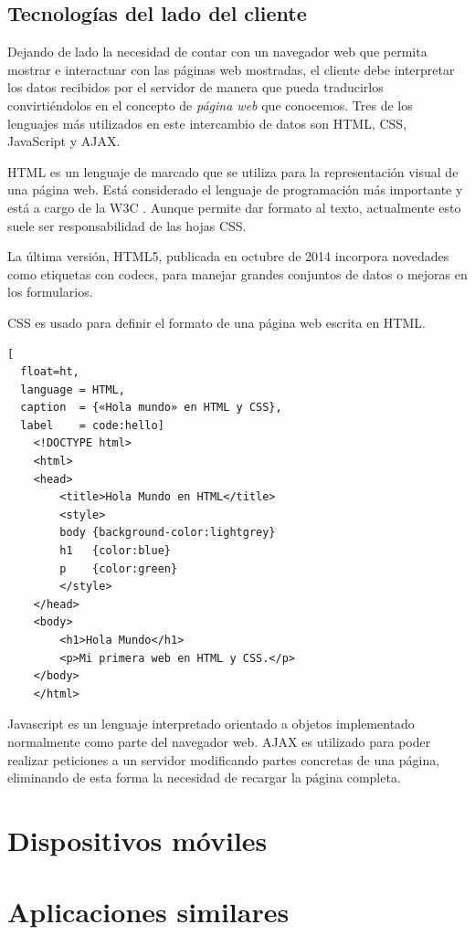 \subsection{Tecnologías del lado del cliente}
Dejando de lado la necesidad de contar con un navegador web que permita mostrar e interactuar con las páginas web mostradas, el cliente debe interpretar los datos recibidos por el servidor de manera que pueda traducirlos convirtiéndolos en el concepto de \textit{página web} que conocemos. Tres de los lenguajes más utilizados en este intercambio de datos son \ac{HTML}, \ac{CSS}, JavaScript y \ac{AJAX}.

\ac{HTML} es un lenguaje de marcado que se utiliza para la representación visual de una página web. Está considerado el lenguaje de programación más importante y está a cargo de la W3C \cite{Worl15}. Aunque permite dar formato al texto, actualmente esto suele ser responsabilidad de las hojas \ac{CSS}.

La última versión, \ac{HTML}5, publicada en octubre de 2014 \cite{Adam14} incorpora novedades como etiquetas con codecs, para manejar grandes conjuntos de datos o mejoras en los formularios.

\ac{CSS} es usado para definir el formato de una página web escrita en \ac{HTML}.

\begin{lstlisting}[
  float=ht,
  language = HTML,
  caption  = {«Hola mundo» en HTML y CSS},
  label    = code:hello]
	<!DOCTYPE html>
	<html>
	<head>
	    <title>Hola Mundo en HTML</title>
		<style>
		body {background-color:lightgrey}
		h1   {color:blue}
		p    {color:green}
		</style>
	</head>
	<body>
		<h1>Hola Mundo</h1>
		<p>Mi primera web en HTML y CSS.</p>
	</body>
	</html>
\end{lstlisting}

Javascript es un lenguaje interpretado orientado a objetos implementado normalmente como parte del navegador web.
\ac{AJAX} es utilizado para poder realizar peticiones a un servidor modificando partes concretas de una página, eliminando de esta forma la necesidad de recargar la página completa.



\section{Dispositivos móviles}

\section{Aplicaciones similares}



